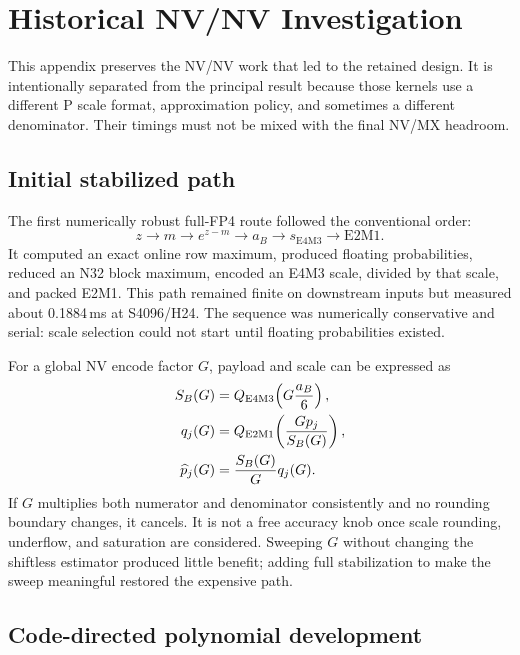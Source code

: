 \section{Historical NV/NV Investigation}
\label{app:nvnv}

This appendix preserves the NV/NV work that led to the retained design. It
is intentionally separated from the principal result because those kernels
use a different P scale format, approximation policy, and sometimes a
different denominator. Their timings must not be mixed with the final NV/MX
headroom.

\subsection{Initial stabilized path}

The first numerically robust full-FP4 route followed the conventional order:
\begin{equation}
  z \rightarrow m \rightarrow e^{z-m} \rightarrow a_B
  \rightarrow s_{\mathrm{E4M3}} \rightarrow \mathrm{E2M1}.
\end{equation}
It computed an exact online row maximum, produced floating probabilities,
reduced an N32 block maximum, encoded an E4M3 scale, divided by that scale,
and packed E2M1. This path remained finite on downstream inputs but measured
about 0.1884\,ms at S4096/H24. The sequence was numerically conservative and
serial: scale selection could not start until floating probabilities existed.

For a global NV encode factor $G$, payload and scale can be expressed as
\begin{align}
  S_B(G) &= Q_{\mathrm{E4M3}}\!\left(G\frac{a_B}{6}\right), \\
  q_j(G) &= Q_{\mathrm{E2M1}}\!\left(\frac{G p_j}{S_B(G)}\right), \\
  \widehat p_j(G) &= \frac{S_B(G)}{G}q_j(G).
\end{align}
If $G$ multiplies both numerator and denominator consistently and no
rounding boundary changes, it cancels. It is not a free accuracy knob once
scale rounding, underflow, and saturation are considered. Sweeping $G$
without changing the shiftless estimator produced little benefit; adding
full stabilization to make the sweep meaningful restored the expensive
path.

\subsection{Code-directed polynomial development}

